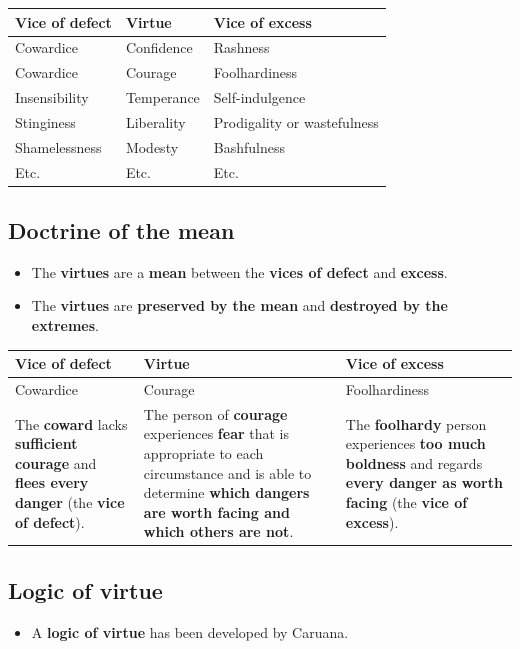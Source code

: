 \documentclass[11pt]{article}
\begin{document}
\begin{center}
\begin{tabularx}{\textwidth}{X|X|X}
Vice of defect & Virtue & Vice of excess\\
\hline
Cowardice & Confidence & Rashness\\
Cowardice & Courage & Foolhardiness\\
Insensibility & Temperance & Self-indulgence\\
Stinginess & Liberality & Prodigality or wastefulness\\
Shamelessness & Modesty & Bashfulness\\
Etc. & Etc. & Etc.\\
\end{tabularx}
\end{center}
\subsection{Doctrine of the mean}
\label{sec:org3e9fd11}
\begin{itemize}
\item The \textbf{virtues} are a \textbf{mean} between the \textbf{vices of defect} and \textbf{excess}.
\item The \textbf{virtues} are \textbf{preserved by the mean} and \textbf{destroyed by the extremes}.
\end{itemize}

\begin{center}
\begin{tabularx}{\textwidth}{|X|X|X|}
\hline
Vice of defect & Virtue & Vice of excess\\
\hline
Cowardice & Courage & Foolhardiness\\
\hline
The \textbf{coward} lacks \textbf{sufficient courage} and \textbf{flees every danger} (the \textbf{vice of defect}). & The person of \textbf{courage} experiences \textbf{fear} that is appropriate to each circumstance and is able to determine \textbf{which dangers are worth facing and which others are not}. & The \textbf{foolhardy} person experiences \textbf{too much boldness} and regards \textbf{every danger as worth facing} (the \textbf{vice of excess}).\\
\hline
\end{tabularx}
\end{center}

 \newpage
\subsection{Logic of virtue}
\label{sec:org1ca0497}
\begin{itemize}
\item A \textbf{logic of virtue} has been developed by Caruana.
\end{itemize}
\end{document}

